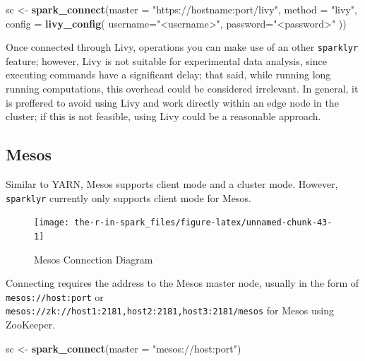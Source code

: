 \documentclass[]{book}
\newenvironment{Shaded}{\begin{snugshade}}{\end{snugshade}}
\newcommand{\DataTypeTok}[1]{\textcolor[rgb]{0.13,0.29,0.53}{#1}}
\newcommand{\KeywordTok}[1]{\textcolor[rgb]{0.13,0.29,0.53}{\textbf{#1}}}
\newcommand{\NormalTok}[1]{#1}
\newcommand{\StringTok}[1]{\textcolor[rgb]{0.31,0.60,0.02}{#1}}
\theoremstyle{definition}
\theoremstyle{definition}
\theoremstyle{definition}
\theoremstyle{remark}
\begin{document}
\begin{Shaded}
\begin{Highlighting}[]
\NormalTok{sc <-}\StringTok{ }\KeywordTok{spark_connect}\NormalTok{(}\DataTypeTok{master =} \StringTok{"https://hostname:port/livy"}\NormalTok{, }\DataTypeTok{method =} \StringTok{"livy"}\NormalTok{, }\DataTypeTok{config =} \KeywordTok{livy_config}\NormalTok{(}
  \DataTypeTok{username=}\StringTok{"<username>"}\NormalTok{,}
  \DataTypeTok{password=}\StringTok{"<password>"}
\NormalTok{))}
\end{Highlighting}
\end{Shaded}

Once connected through Livy, operations you can make use of an other
\texttt{sparklyr} feature; however, Livy is not suitable for
experimental data analysis, since executing commands have a significant
delay; that said, while running long running computations, this overhead
could be considered irrelevant. In general, it is preffered to avoid
using Livy and work directly within an edge node in the cluster; if this
is not feasible, using Livy could be a reasonable approach.

\hypertarget{mesos-1}{%
\subsection{Mesos}\label{mesos-1}}

Similar to YARN, Mesos supports client mode and a cluster mode. However,
\texttt{sparklyr} currently only supports client mode for Mesos.

\begin{figure}

{\centering \texttt{[image: the-r-in-spark\_files/figure-latex/unnamed-chunk-43-1]} 

}

\caption{Mesos Connection Diagram}\label{fig:unnamed-chunk-43}
\end{figure}

Connecting requires the address to the Mesos master node, usually in the
form of \texttt{mesos://host:port} or
\texttt{mesos://zk://host1:2181,host2:2181,host3:2181/mesos} for Mesos
using ZooKeeper.

\begin{Shaded}
\begin{Highlighting}[]
\NormalTok{sc <-}\StringTok{ }\KeywordTok{spark_connect}\NormalTok{(}\DataTypeTok{master =} \StringTok{"mesos://host:port"}\NormalTok{)}
\end{Highlighting}
\end{Shaded}
\end{document}
